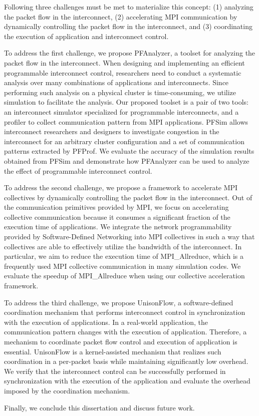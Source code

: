 Following three challenges must be met to materialize this concept: (1)
analyzing the packet flow in the interconnect, (2) accelerating MPI
communication by dynamically controlling the packet flow in the interconnect,
and (3) coordinating the execution of application and interconnect control.

To address the first challenge, we propose PFAnalyzer, a toolset for analyzing
the packet flow in the interconnect. When designing and implementing an
efficient programmable interconnect control, researchers need to conduct a
systematic analysis over many combinations of applications and interconnects.
Since performing such analysis on a physical cluster is time-consuming, we
utilize simulation to facilitate the analysis. Our proposed toolset is a pair
of two tools: an interconnect simulator specialized for programmable
interconnects, and a profiler to collect communication pattern from MPI
applications. PFSim allows interconnect researchers and designers to
investigate congestion in the interconnect for an arbitrary cluster
configuration and a set of communication patterns extracted by PFProf. We
evaluate the accuracy of the simulation results obtained from PFSim and
demonstrate how PFAnalyzer can be used to analyze the effect of programmable
interconnect control.

To address the second challenge, we propose a framework to accelerate MPI
collectives by dynamically controlling the packet flow in the interconnect.
Out of the communication primitives provided by MPI, we focus on accelerating
collective communication because it consumes a significant fraction of the
execution time of applications. We integrate the network programmability
provided by Software-Defined Networking into MPI collectives in such a way
that collectives are able to effectively utilize the bandwidth of the
interconnect. In particular, we aim to reduce the execution time of
MPI\_Allreduce, which is a frequently used MPI collective communication in
many simulation codes. We evaluate the speedup of MPI\_Allreduce when using
our collective acceleration framework.

To address the third challenge, we propose UnisonFlow, a software-defined
coordination mechanism that performs interconnect control in synchronization
with the execution of applications. In a real-world application, the
communication pattern changes with the execution of application. Therefore, a
mechanism to coordinate packet flow control and execution of application is
essential. UnisonFlow is a kernel-assisted mechanism that realizes such
coordination in a per-packet basis while maintaining significantly low
overhead. We verify that the interconnect control can be successfully
performed in synchronization with the execution of the application and
evaluate the overhead imposed by the coordination mechanism.

Finally, we conclude this dissertation and discuss future work.
